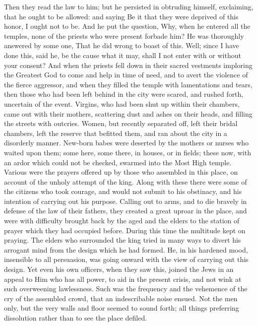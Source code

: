 {Then they read the law to him; but he persisted in obtruding himself, exclaiming, that he ought to be allowed: and saying Be it that they were deprived of this honor, I ought not to be.
And he put the question, Why, when he entered all the temples, none of the priests who were present forbade him?
He was thoroughly answered by some one, That he did wrong to boast of this.
Well; since I have done this, said he, be the cause what it may, shall I not enter with or without your consent?
And when the priests fell down in their sacred vestments imploring the Greatest God to come and help in time of need, and to avert the violence of the fierce aggressor, and when they filled the temple with lamentations and tears,
then those who had been left behind in the city were scared, and rushed forth, uncertain of the event.
Virgins, who had been shut up within their chambers, came out with their mothers, scattering dust and ashes on their heads, and filling the streets with outcries.
Women, but recently separated off, left their bridal chambers, left the reserve that befitted them, and ran about the city in a disorderly manner.
New-born babes were deserted by the mothers or nurses who waited upon them; some here, some there, in houses, or in fields; these now, with an ardor which could not be checked, swarmed into the Most High temple.
Various were the prayers offered up by those who assembled in this place, on account of the unholy attempt of the king.
Along with these there were some of the citizens who took courage, and would not submit to his obstinacy, and his intention of carrying out his purpose.
Calling out to arms, and to die bravely in defense of the law of their fathers, they created a great uproar in the place, and were with difficulty brought back by the aged and the elders to the station of prayer which they had occupied before.
During this time the multitude kept on praying.
The elders who surrounded the king tried in many ways to divert his arrogant mind from the design which he had formed.
He, in his hardened mood, insensible to all persuasion, was going onward with the view of carrying out this design.
Yet even his own officers, when they saw this, joined the Jews in an appeal to Him who has all power, to aid in the present crisis, and not wink at such overweening lawlessness.
Such was the frequency and the vehemence of the cry of the assembled crowd, that an indescribable noise ensued.
Not the men only, but the very walls and floor seemed to sound forth; all things preferring dissolution rather than to see the place defiled.

}

